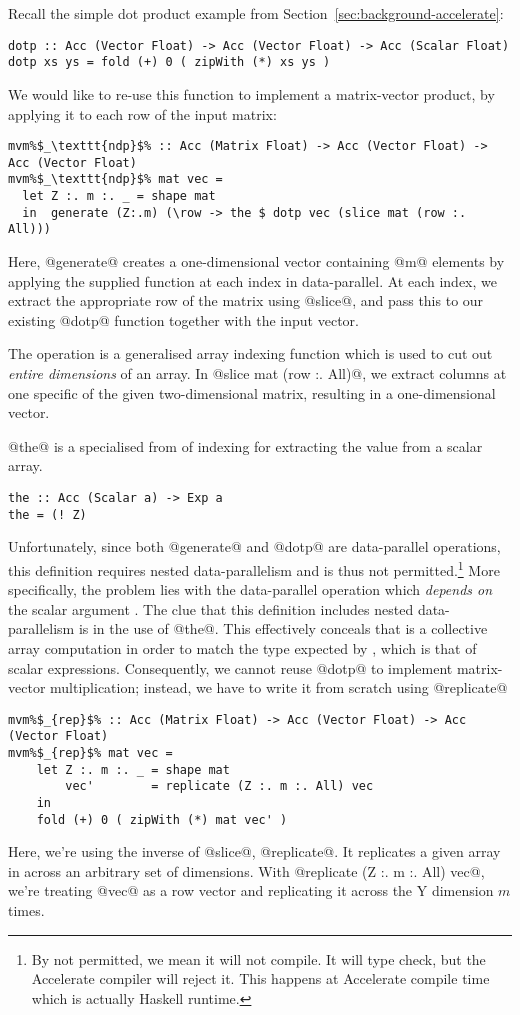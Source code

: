 Recall the simple dot product example from Section~\ref{sec:background-accelerate}:
%
\begin{lstlisting}
dotp :: Acc (Vector Float) -> Acc (Vector Float) -> Acc (Scalar Float)
dotp xs ys = fold (+) 0 ( zipWith (*) xs ys )
\end{lstlisting}
%
We would like to re-use this function to implement a matrix-vector product, by applying it to each row of the input matrix:
%
\begin{lstlisting}
mvm%$_\texttt{ndp}$% :: Acc (Matrix Float) -> Acc (Vector Float) -> Acc (Vector Float)
mvm%$_\texttt{ndp}$% mat vec =
  let Z :. m :. _ = shape mat
  in  generate (Z:.m) (\row -> the $ dotp vec (slice mat (row :. All)))
\end{lstlisting}
%
Here, @generate@ creates a one-dimensional vector containing @m@ elements by
applying the supplied function at each index in data-parallel. At each index, we
extract the appropriate row of the matrix using @slice@, and pass this to our existing @dotp@ function together with the input vector.

The  operation is a generalised array indexing function
which is used to cut out \emph{entire dimensions} of an array. In @slice mat (row :. All)@,
we extract  columns at one specific  of the given
two-dimensional matrix, resulting in a one-dimensional vector.

@the@ is a specialised from of indexing for extracting the value from a scalar array.
%
\begin{lstlisting}
the :: Acc (Scalar a) -> Exp a
the = (! Z)
\end{lstlisting}
%

Unfortunately, since both @generate@ and @dotp@ are data-parallel operations,
this definition requires nested data-parallelism and is thus not permitted.\footnote{By not permitted, we mean it will not compile. It will type check, but the Accelerate compiler will reject it. This happens at Accelerate compile time which is actually Haskell runtime.}
%
More specifically, the problem lies with the data-parallel operation
 which \emph{depends on} the scalar argument . The clue that
this definition includes nested data-parallelism is in the use of @the@.
This effectively conceals that  is a collective array computation in order to match the type expected by , which is that of scalar expressions.
Consequently, we cannot reuse @dotp@ to implement matrix-vector multiplication; instead, we have to write it from scratch using @replicate@
%
\begin{lstlisting}
mvm%$_{rep}$% :: Acc (Matrix Float) -> Acc (Vector Float) -> Acc (Vector Float)
mvm%$_{rep}$% mat vec =
    let Z :. m :. _ = shape mat
        vec'        = replicate (Z :. m :. All) vec
    in
    fold (+) 0 ( zipWith (*) mat vec' )
\end{lstlisting}
%
Here, we're using the inverse of @slice@, @replicate@. It replicates a given array in across an arbitrary set of dimensions. With @replicate (Z :. m :. All) vec@, we're treating @vec@ as a row vector and replicating it across the Y dimension $m$ times.

